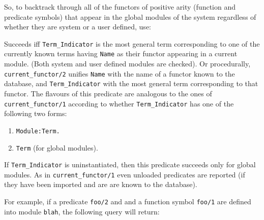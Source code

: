 \begin{description}
\begin{enumerate}
    \end{enumerate}

    So, to backtrack through all of the functors of positive arity (function
    and predicate symbols) that appear in the global modules of the system
    regardless of whether they are system or a user defined, use:


    Succeeds iff {\tt Term\_Indicator} is the most general term 
    corresponding to one of the currently known terms having {\tt Name} 
    as their functor appearing in a current module.  (Both system and user 
    defined modules are checked).  Or procedurally, 
    {\tt current\_functor/2} unifies {\tt Name} with the name of a functor 
    known to the database, and {\tt Term\_Indicator} with the most 
    general term corresponding to that functor. The flavours of this predicate 
    are analogous to the ones of {\tt current\_functor/1} according to 
    whether {\tt Term\_Indicator} has one of the following two forms:
    \begin{enumerate}
    \item{\tt Module:Term.}
    \item{\tt Term} (for global modules).
    \end{enumerate}
    If {\tt Term\_Indicator} is uninstantiated, then this predicate succeeds
    only for global modules.  
    As in {\tt current\_functor/1} even unloaded predicates are reported
    (if they have been imported and are are known to the database).

    For example, if a predicate {\tt foo/2} and and a function symbol 
    {\tt foo/1} are defined into module {\tt blah}, the following query 
    will return:



\end{description}
